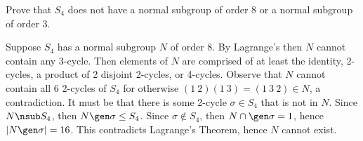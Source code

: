 \begin{problems}
\begin{sol}
    \end{sol}
    \item Prove that $S_4$ does not have a normal subgroup of order 8 or a normal subgroup of order 3.
    \begin{sol}
        Suppose $S_4$ has a normal subgroup $N$ of order 8. By Lagrange's then $N$ cannot contain any 3-cycle. Then elements of $N$ are comprised of at least the identity, 2-cycles, a product of 2 disjoint 2-cycles, or 4-cycles. Observe that $N$ cannot contain all 6 2-cycles of $S_4$ for otherwise $(1\ 2)(1\ 3) = (1\ 3\ 2) \in N$, a contradiction. It must be that there is some 2-cycle $\sigma \in S_4$ that is not in $N$. Since $N \nsub S_4$, then $N \gen\sigma \leq S_4$. Since $\sigma \not\in S_4$, then $N \cap \gen\sigma = 1$, hence $|N \gen\sigma| = 16$. This contradicts Lagrange's Theorem, hence $N$ cannot exist.


\end{sol}
\end{problems}
